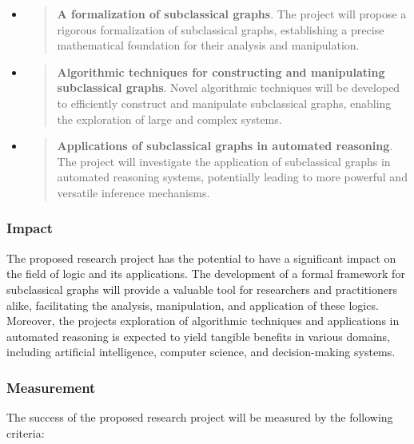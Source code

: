\begin{itemize}
\item
  \begin{quote}
  \textbf{A formalization of subclassical graphs}. The project will
  propose a rigorous formalization of subclassical graphs, establishing
  a precise mathematical foundation for their analysis and manipulation.
  \end{quote}
\item
  \begin{quote}
  \textbf{Algorithmic techniques for constructing and manipulating
  subclassical graphs}. Novel algorithmic techniques will be developed
  to efficiently construct and manipulate subclassical graphs, enabling
  the exploration of large and complex systems.
  \end{quote}
\item
  \begin{quote}
  \textbf{Applications of subclassical graphs in automated reasoning}.
  The project will investigate the application of subclassical graphs in
  automated reasoning systems, potentially leading to more powerful and
  versatile inference mechanisms.
  \end{quote}
\end{itemize}

\hypertarget{impact}{%
\subsubsection{Impact}\label{impact}}

The proposed research project has the potential to have a significant
impact on the field of logic and its applications. The development of a
formal framework for subclassical graphs will provide a valuable tool
for researchers and practitioners alike, facilitating the analysis,
manipulation, and application of these logics. Moreover, the
project\textquotesingle s exploration of algorithmic techniques and
applications in automated reasoning is expected to yield tangible
benefits in various domains, including artificial intelligence, computer
science, and decision-making systems.

\hypertarget{measurement}{%
\subsubsection{Measurement}\label{measurement}}

The success of the proposed research project will be measured by the
following criteria:

